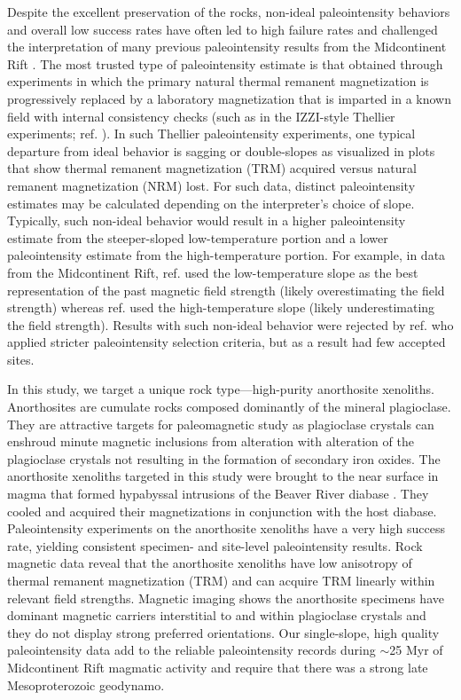\documentclass[9pt,twocolumn,twoside,lineno]{pnas-new}
\begin{document}
Despite the excellent preservation of the rocks, non-ideal paleointensity behaviors and overall low success rates have often led to high failure rates and challenged the interpretation of many previous paleointensity results from the Midcontinent Rift \cite{Pesonen1983a, Kulakov2013a}. The most trusted type of paleointensity estimate is that obtained through experiments in which the primary natural thermal remanent magnetization is progressively replaced by a laboratory magnetization that is imparted in a known field with internal consistency checks (such as in the IZZI-style Thellier experiments; ref. \citealp{Yu2004a}). In such Thellier paleointensity experiments, one typical departure from ideal behavior is sagging or double-slopes as visualized in plots that show thermal remanent magnetization (TRM) acquired versus natural remanent magnetization (NRM) lost. For such data, distinct paleointensity estimates may be calculated depending on the interpreter's choice of slope. Typically, such non-ideal behavior would result in a higher paleointensity estimate from the steeper-sloped low-temperature portion and a lower paleointensity estimate from the high-temperature portion. For example, in data from the Midcontinent Rift, ref. \citealp{Pesonen1983a} used the low-temperature slope as the best representation of the past magnetic field strength (likely overestimating the field strength) whereas ref. \citealp{Kulakov2013a} used the high-temperature slope (likely underestimating the field strength). Results with such non-ideal behavior were rejected by ref. \citealp{Sprain2018a} who applied stricter paleointensity selection criteria, but as a result had few accepted sites.

In this study, we target a unique rock type---high-purity anorthosite xenoliths. Anorthosites are cumulate rocks composed dominantly of the mineral plagioclase. They are attractive targets for paleomagnetic study as plagioclase crystals can enshroud minute magnetic inclusions from alteration with alteration of the plagioclase crystals not resulting in the formation of secondary iron oxides. The anorthosite xenoliths targeted in this study were brought to the near surface in magma that formed hypabyssal intrusions of the Beaver River diabase \cite{Zhang2021b}. They cooled and acquired their magnetizations in conjunction with the host diabase. Paleointensity experiments on the anorthosite xenoliths have a very high success rate, yielding consistent specimen- and site-level paleointensity results. Rock magnetic data reveal that the anorthosite xenoliths have low anisotropy of thermal remanent magnetization (TRM) and can acquire TRM linearly within relevant field strengths. Magnetic imaging shows the anorthosite specimens have dominant magnetic carriers interstitial to and within plagioclase crystals and they do not display strong preferred orientations. Our single-slope, high quality paleointensity data add to the reliable paleointensity records during $\sim$25 Myr of Midcontinent Rift magmatic activity and require that there was a strong late Mesoproterozoic geodynamo.
\end{document}
